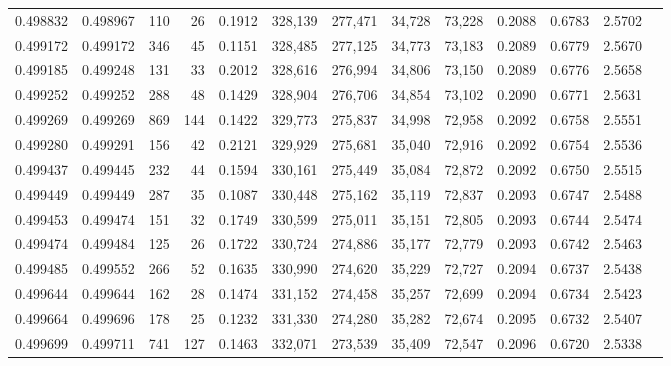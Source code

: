 \begin{tabular}{rrrrrrrrrrrrr}
0.498832 & 0.498967 &   110 &    26 &                                     0.1912 & 328,139 & 277,471 &  34,728 &  73,228 & 0.2088 & 0.6783 & 2.5702 \\
0.499172 & 0.499172 &   346 &    45 &                                     0.1151 & 328,485 & 277,125 &  34,773 &  73,183 & 0.2089 & 0.6779 & 2.5670 \\
0.499185 & 0.499248 &   131 &    33 &                                     0.2012 & 328,616 & 276,994 &  34,806 &  73,150 & 0.2089 & 0.6776 & 2.5658 \\
0.499252 & 0.499252 &   288 &    48 &                                     0.1429 & 328,904 & 276,706 &  34,854 &  73,102 & 0.2090 & 0.6771 & 2.5631 \\
0.499269 & 0.499269 &   869 &   144 &                                     0.1422 & 329,773 & 275,837 &  34,998 &  72,958 & 0.2092 & 0.6758 & 2.5551 \\
0.499280 & 0.499291 &   156 &    42 &                                     0.2121 & 329,929 & 275,681 &  35,040 &  72,916 & 0.2092 & 0.6754 & 2.5536 \\
0.499437 & 0.499445 &   232 &    44 &                                     0.1594 & 330,161 & 275,449 &  35,084 &  72,872 & 0.2092 & 0.6750 & 2.5515 \\
0.499449 & 0.499449 &   287 &    35 &                                     0.1087 & 330,448 & 275,162 &  35,119 &  72,837 & 0.2093 & 0.6747 & 2.5488 \\
0.499453 & 0.499474 &   151 &    32 &                                     0.1749 & 330,599 & 275,011 &  35,151 &  72,805 & 0.2093 & 0.6744 & 2.5474 \\
0.499474 & 0.499484 &   125 &    26 &                                     0.1722 & 330,724 & 274,886 &  35,177 &  72,779 & 0.2093 & 0.6742 & 2.5463 \\
0.499485 & 0.499552 &   266 &    52 &                                     0.1635 & 330,990 & 274,620 &  35,229 &  72,727 & 0.2094 & 0.6737 & 2.5438 \\
0.499644 & 0.499644 &   162 &    28 &                                     0.1474 & 331,152 & 274,458 &  35,257 &  72,699 & 0.2094 & 0.6734 & 2.5423 \\
0.499664 & 0.499696 &   178 &    25 &                                     0.1232 & 331,330 & 274,280 &  35,282 &  72,674 & 0.2095 & 0.6732 & 2.5407 \\
0.499699 & 0.499711 &   741 &   127 &                                     0.1463 & 332,071 & 273,539 &  35,409 &  72,547 & 0.2096 & 0.6720 & 2.5338 \\

\end{tabular}
